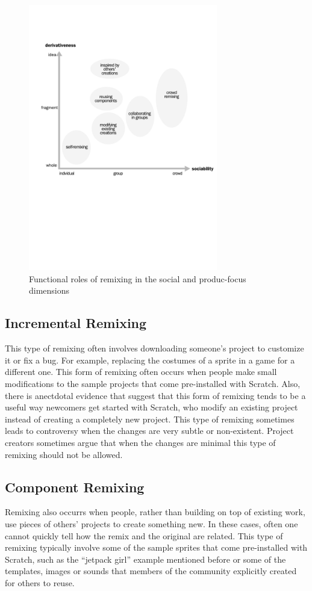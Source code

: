 \begin{figure}
\centering
\includegraphics[width=3.25in]{figures/function.pdf}
\caption{Functional roles of remixing in the social and produc-focus dimensions}
\label{fig:function}
\end{figure}

\subsection{Incremental Remixing}
This type of remixing often involves downloading someone's project to customize it or fix a bug. 
For example, replacing the costumes of a sprite in a game for a different one. 
This form of remixing often occurs when people make small modifications to the sample projects that come pre-installed with Scratch.
Also, there is anectdotal evidence that suggest that this form of remixing tends to be a useful way newcomers get started with Scratch, who modify an existing project instead of creating a completely new project.
This type of remixing sometimes leads to controversy when the changes are very subtle or non-existent.
Project creators sometimes argue that when the changes are minimal this type of remixing should not be allowed.

\subsection{Component Remixing}
Remixing also occurrs when people, rather than building on top of existing work, use pieces of others' projects to create something new. 
In these cases, often one cannot quickly tell how the remix and the original are related.
This type of remixing typically involve some of the sample sprites that come pre-installed with Scratch, such as the ``jetpack girl'' example mentioned before or some of the templates, images or sounds that members of the community explicitly created for others to reuse.


